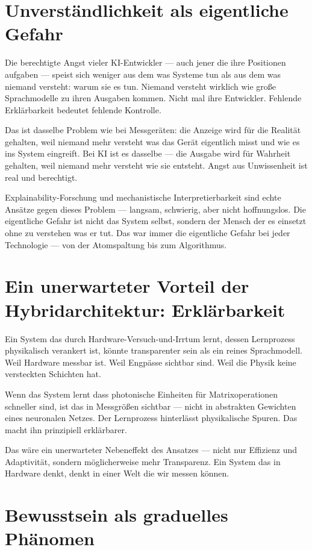 \documentclass[a4paper,12pt]{article}
\begin{document}
\section{Unverständlichkeit als eigentliche Gefahr}

Die berechtigte Angst vieler KI-Entwickler --- auch jener die ihre Positionen aufgaben --- speist sich weniger aus dem was Systeme tun als aus dem was niemand versteht: warum sie es tun. Niemand versteht wirklich wie große Sprachmodelle zu ihren Ausgaben kommen. Nicht mal ihre Entwickler. Fehlende Erklärbarkeit bedeutet fehlende Kontrolle.

Das ist dasselbe Problem wie bei Messgeräten: die Anzeige wird für die Realität gehalten, weil niemand mehr versteht was das Gerät eigentlich misst und wie es ins System eingreift. Bei KI ist es dasselbe --- die Ausgabe wird für Wahrheit gehalten, weil niemand mehr versteht wie sie entsteht. Angst aus Unwissenheit ist real und berechtigt.

Explainability-Forschung und mechanistische Interpretierbarkeit sind echte Ansätze gegen dieses Problem --- langsam, schwierig, aber nicht hoffnungslos. Die eigentliche Gefahr ist nicht das System selbst, sondern der Mensch der es einsetzt ohne zu verstehen was er tut. Das war immer die eigentliche Gefahr bei jeder Technologie --- von der Atomspaltung bis zum Algorithmus.

\section{Ein unerwarteter Vorteil der Hybridarchitektur: Erklärbarkeit}

Ein System das durch Hardware-Versuch-und-Irrtum lernt, dessen Lernprozess physikalisch verankert ist, könnte transparenter sein als ein reines Sprachmodell. Weil Hardware messbar ist. Weil Engpässe sichtbar sind. Weil die Physik keine versteckten Schichten hat.

Wenn das System lernt dass photonische Einheiten für Matrixoperationen schneller sind, ist das in Messgrößen sichtbar --- nicht in abstrakten Gewichten eines neuronalen Netzes. Der Lernprozess hinterlässt physikalische Spuren. Das macht ihn prinzipiell erklärbarer.

Das wäre ein unerwarteter Nebeneffekt des Ansatzes --- nicht nur Effizienz und Adaptivität, sondern möglicherweise mehr Transparenz. Ein System das in Hardware denkt, denkt in einer Welt die wir messen können.

\section{Bewusstsein als graduelles Phänomen}
\end{document}

